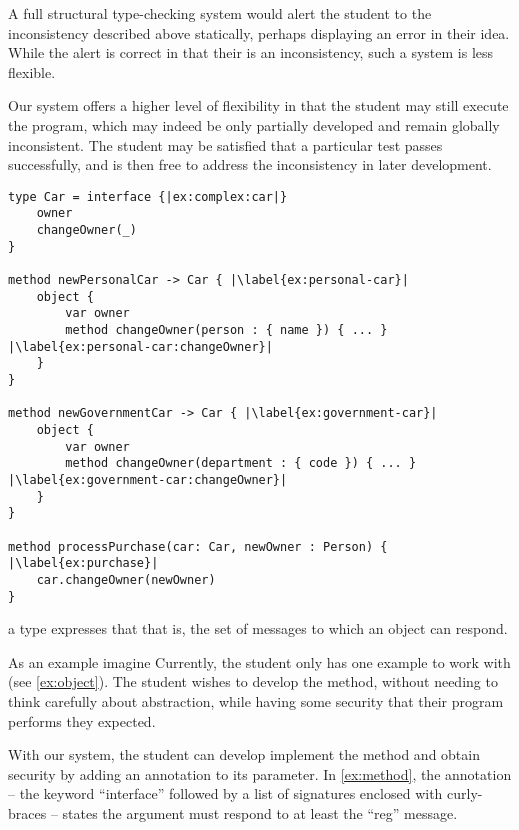 A full structural type-checking system would alert the student to 
the inconsistency described above statically,
perhaps displaying an error in their idea. 
While the alert is correct in that their is an inconsistency,
such a system is less flexible. 

Our system offers a higher level of flexibility in that the student
may still execute the program, 
which may indeed be only partially developed and remain globally inconsistent.
The student may be satisfied that a particular test passes successfully, and
is then free to address the inconsistency in later development.


\begin{lstlisting}[caption={A well-typed but globally inconsistent program.},escapechar=|,label={ex:complex}]
type Car = interface {|ex:complex:car|}
    owner
    changeOwner(_)
}

method newPersonalCar -> Car { |\label{ex:personal-car}|
    object {
        var owner
        method changeOwner(person : { name }) { ... } |\label{ex:personal-car:changeOwner}|
    }
}

method newGovernmentCar -> Car { |\label{ex:government-car}|
    object {
        var owner
        method changeOwner(department : { code }) { ... } |\label{ex:government-car:changeOwner}|
    }
}

method processPurchase(car: Car, newOwner : Person) { |\label{ex:purchase}|
    car.changeOwner(newOwner)
}
\end{lstlisting}


 a type expresses that 
that is, the set of messages to which an object can respond.

As an example imagine  
Currently, the student only has one example to work with (see \cref{ex:object}).
The student wishes to develop the method,
without needing to think carefully about abstraction,
while having some security that their program
performs they expected.



With our system, the student can develop implement the method and 
obtain security by adding an annotation to its parameter. 
In \cref{ex:method}, the annotation
-- the keyword ``interface'' followed by a list of signatures enclosed with curly-braces --
states the argument must respond to at least the ``reg'' message. 

\begin{lstlisting}[label={ex:method},caption={A method with its argument annotated with an interface literal, stating that the value must respond to at least the ``reg'' message.}]

\end{lstlisting}


